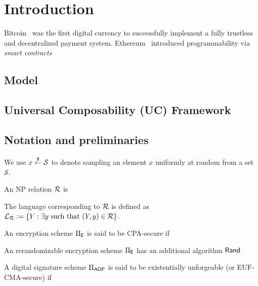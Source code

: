\section{Introduction}

Bitcoin~\cite{bitcoin} was the first digital currency to successfully implement a fully trustless and decentralized payment system.  Ethereum~\cite{ethereum} introduced programmability via \emph{smart contracts} 

\subsection{Model} 

\subsection{Universal Composability (UC) Framework}

\subsection{Notation and preliminaries}

We use $x \stackrel{\$}{\gets} \mathcal{S}$ to denote sampling an element $x$ uniformly at random from a set $\mathcal{S}$.

\begin{definition}[NP Relation]
    An NP relation $\mathcal{R}$ is 

    The language corresponding to $\mathcal{R}$ is defined as $\mathcal{L}_{\mathcal{R}} := \{ Y : \exists y \text{ such that } (Y, y) \in \mathcal{R} \}$.
\end{definition}

\begin{definition}
    An encryption scheme $\Pi_{\mathsf{E}}$ is said to be CPA-secure if 
\end{definition}

\begin{definition}
    An rerandomizable encryption scheme $\Pi_{\mathsf{E}}$ has an additional algorithm $\sf Rand$ 
\end{definition}

\begin{definition}
    A digital signature scheme $\Pi_{\mathsf{ADP}}$ is said to be existentially unforgeable (or EUF-CMA-secure) if 
\end{definition}